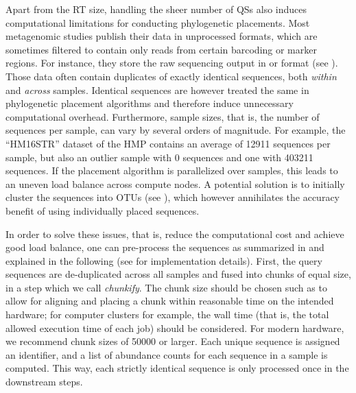 Apart from the \ac{RT} size, handling the sheer number of \acp{QS}
also induces computational limitations for conducting phylogenetic placements.
Most metagenomic studies publish their data in unprocessed formats,
which are sometimes filtered to contain only reads from certain barcoding or marker regions.
For instance, they store the raw sequencing output in  \cite{Pearson1988}
or  \cite{Cock2009} format (see ).
Those data often contain duplicates of exactly identical sequences, both {\em within} and {\em across} samples.
Identical sequences are however treated the same in phylogenetic placement algorithms
and therefore induce unnecessary computational overhead.
Furthermore, sample sizes, that is, the number of sequences per sample, can vary by several orders of magnitude.
For example, the ``HM16STR'' dataset of the \acf{HMP} \cite{Huttenhower2012,Methe2012}
contains an average of \num{12 911} sequences per sample,
but also an outlier sample with \num{0} sequences and one with \num{403 211} sequences.
If the placement algorithm is parallelized over samples, this leads to an uneven load balance across compute nodes.
A potential solution is to initially cluster the sequences into OTUs
(see ),
which however annihilates the accuracy benefit of using individually placed sequences.

In order to solve these issues, that is, reduce the computational cost and achieve good load balance,
one can pre-process the sequences as summarized in  and explained in the following
(see  for implementation details).
First, the query sequences are de-duplicated across all samples and fused into chunks of equal size,
in a step which we call \emph{chunkify}.
The chunk size should be chosen such as to allow for aligning and placing a chunk
within reasonable time on the intended hardware;
for computer clusters for example, the wall time (that is, the total allowed execution time of each job) should be considered.
For modern hardware, we recommend chunk sizes of \num{50 000} or larger.
Each unique sequence is assigned an identifier,
and a list of abundance counts for each sequence in a sample is computed.
This way, each strictly identical sequence is only processed once in the downstream steps.

